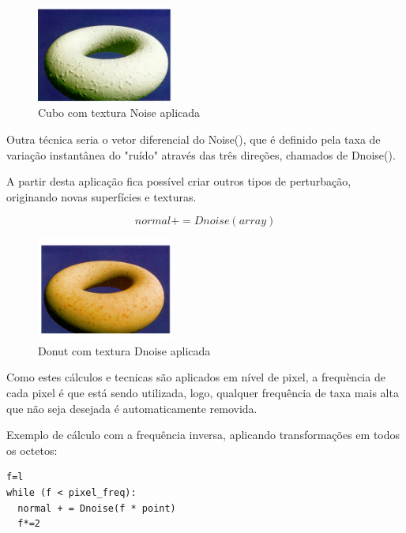 \begin{figure}[H]
    \centering
    \includegraphics[width=0.4\textwidth]{img/donut3.png}
    \caption{Cubo com textura Noise aplicada}
    \label{fig:cube_noise}
\end{figure}

Outra técnica seria o vetor diferencial do Noise(), que é definido pela taxa de variação instantânea do "ruído" através das três direções, chamados de Dnoise().

A partir desta aplicação fica possível criar outros tipos de perturbação, originando novas superfícies e texturas. 

$$
normal += Dnoise(array)
$$

\begin{figure}[H]
    \centering
    \includegraphics[width=0.4\textwidth]{img/donut4.png}
    \caption{Donut com textura Dnoise aplicada}
    \label{fig:donut_dnoise}
\end{figure}

Como estes cálculos e tecnicas são aplicados em nível de pixel, a frequència de cada pixel é que está sendo utilizada, logo, qualquer frequência de taxa mais alta que não seja desejada é automaticamente removida. 

Exemplo de cálculo com a frequência inversa, aplicando transformações em todos os octetos:

\begin{verbatim}
f=l
while (f < pixel_freq):
  normal + = Dnoise(f * point)
  f*=2 
\end{verbatim}

